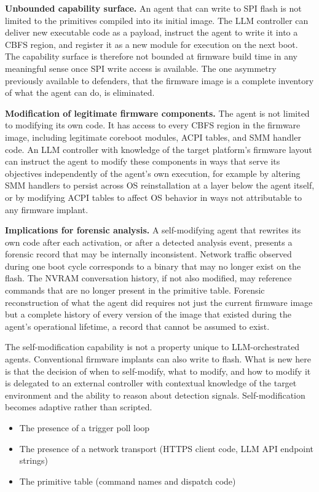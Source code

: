 \documentclass[11pt,a4paper]{article}
\begin{document}
\textbf{Unbounded capability surface.} An agent that can write to SPI flash is not limited to the primitives compiled into its initial image. The LLM controller can deliver new executable code as a payload, instruct the agent to write it into a CBFS region, and register it as a new module for execution on the next boot. The capability surface is therefore not bounded at firmware build time in any meaningful sense once SPI write access is available. The one asymmetry previously available to defenders, that the firmware image is a complete inventory of what the agent can do, is eliminated.

\textbf{Modification of legitimate firmware components.} The agent is not limited to modifying its own code. It has access to every CBFS region in the firmware image, including legitimate coreboot modules, ACPI tables, and SMM handler code. An LLM controller with knowledge of the target platform's firmware layout can instruct the agent to modify these components in ways that serve its objectives independently of the agent's own execution, for example by altering SMM handlers to persist across OS reinstallation at a layer below the agent itself, or by modifying ACPI tables to affect OS behavior in ways not attributable to any firmware implant.

\textbf{Implications for forensic analysis.} A self-modifying agent that rewrites its own code after each activation, or after a detected analysis event, presents a forensic record that may be internally inconsistent. Network traffic observed during one boot cycle corresponds to a binary that may no longer exist on the flash. The NVRAM conversation history, if not also modified, may reference commands that are no longer present in the primitive table. Forensic reconstruction of what the agent did requires not just the current firmware image but a complete history of every version of the image that existed during the agent's operational lifetime, a record that cannot be assumed to exist.

The self-modification capability is not a property unique to LLM-orchestrated agents. Conventional firmware implants can also write to flash. What is new here is that the decision of when to self-modify, what to modify, and how to modify it is delegated to an external controller with contextual knowledge of the target environment and the ability to reason about detection signals. Self-modification becomes adaptive rather than scripted.

\begin{itemize}[noitemsep]
\item The presence of a trigger poll loop
\item The presence of a network transport (HTTPS client code, LLM API endpoint strings)
\item The primitive table (command names and dispatch code)
\end{itemize}
\end{document}
